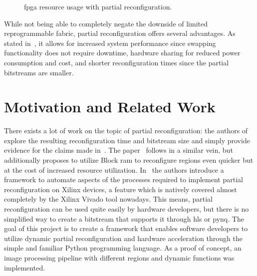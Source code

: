 \documentclass{scrartcl}
\begin{document}
\begin{figure}[h]
    \caption{\gls{fpga} resource usage with partial reconfiguration.}%
    \label{fig:reconf}%
\end{figure}

While not being able to completely negate the downside of limited reprogrammable
fabric, partial reconfiguration offers several advantages. As stated
in~\cite{kao2005benefits}, it allows for increased system performance since
swapping functionality does not require downtime, hardware sharing for reduced
power consumption and cost, and shorter reconfiguration times since the partial
bitstreams are smaller.


\section{Motivation and Related Work}

There exists a lot of work on the topic of partial reconfiguration: the authors
of~\cite{lie2009dynamic} explore the resulting reconfiguration time and
bitstream size and simply provide evidence for the claims made
in~\cite{kao2005benefits}. The paper~\cite{liu2009run} follows in a similar
vein, but additionally proposes to utilize Block \gls{ram} to reconfigure
regions even quicker but at the cost of increased resource utilization.
In~\cite{beckhoff2012go} the authors introduce a framework to automate aspects
of the processes required to implement partial reconfiguration on Xilinx
devices, a feature which is natively covered almost completely by the Xilinx
Vivado tool nowadays. This means, partial reconfiguration can be used quite
easily by hardware developers, but there is no simplified way to create a
bitstream that supports it through \gls{hls} or \gls{pynq}. The goal of this
project is to create a framework that enables software developers to utilize
dynamic partial reconfiguration and hardware acceleration through the simple and
familiar Python programming language. As a proof of concept, an image processing
pipeline with different regions and dynamic functions was implemented.
\end{document}
